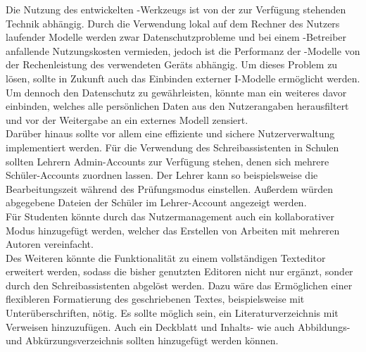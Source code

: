\documentclass[../main.tex]{subfiles}
\begin{document}
Die Nutzung des entwickelten -Werkzeugs ist von der zur Verfügung stehenden Technik abhängig. Durch die Verwendung lokal auf dem Rechner des Nutzers laufender Modelle werden zwar 
Datenschutzprobleme und bei einem -Betreiber anfallende Nutzungskosten vermieden, jedoch ist die Performanz der -Modelle von der Rechenleistung des verwendeten Geräts abhängig. 
Um dieses Problem zu lösen, sollte in Zukunft auch das Einbinden externer I-Modelle ermöglicht werden. Um dennoch den Datenschutz zu gewährleisten, könnte man ein weiteres 
davor einbinden, welches alle persönlichen Daten aus den Nutzerangaben herausfiltert und vor der Weitergabe an ein externes Modell zensiert.\\ 
Darüber hinaus sollte vor allem eine effiziente und sichere Nutzerverwaltung implementiert werden. Für die Verwendung des Schreibassistenten in Schulen sollten Lehrern Admin-Accounts 
zur Verfügung stehen, denen sich mehrere Schüler-Accounts zuordnen lassen. Der Lehrer kann so beispielsweise die Bearbeitungszeit während des Prüfungsmodus einstellen. Außerdem 
würden abgegebene Dateien der Schüler im Lehrer-Account angezeigt werden.\\
Für Studenten könnte durch das Nutzermanagement auch ein kollaborativer Modus hinzugefügt werden, welcher das Erstellen von Arbeiten mit mehreren Autoren vereinfacht. \\
Des Weiteren könnte die Funktionalität zu einem vollständigen Texteditor erweitert werden, sodass die bisher genutzten Editoren nicht nur ergänzt, sonder durch den Schreibassistenten 
abgelöst werden. Dazu wäre das Ermöglichen einer flexibleren Formatierung des geschriebenen Textes, beispielsweise mit Unterüberschriften, nötig. Es sollte möglich sein, ein 
Literaturverzeichnis mit Verweisen hinzuzufügen. Auch ein Deckblatt und Inhalts- wie auch Abbildungs- und Abkürzungsverzeichnis sollten hinzugefügt werden können.
\end{document}
